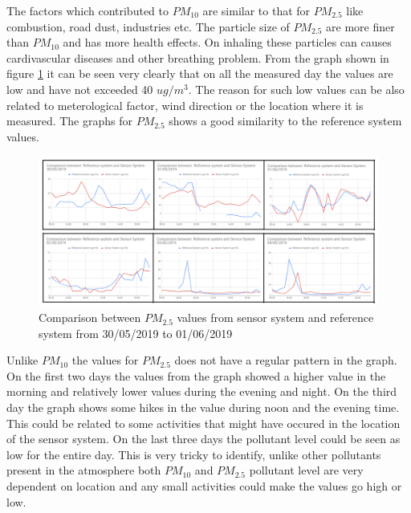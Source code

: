 The factors which contributed to $PM_{10}$ are similar to that for $PM_{2.5}$ like combustion, road dust, industries etc. The particle size of $PM_{2.5}$ are more finer than $PM_{10}$ and has more health effects. On inhaling these particles can causes cardivascular diseases and other breathing problem. From the graph shown in figure \ref{PM2.5} it can be seen very clearly that on all the measured day the values are low and have not exceeded 40 $ug/m^3$. The reason for such low values can be also related to meterological factor, wind direction or the location where it is measured. The graphs for $PM_{2.5}$ shows a good similarity to the reference system values.



\begin{figure}[h]
  \begin{center}
  \includegraphics[scale=0.70]{images/figure27.png}
  \end{center}
  \caption{Comparison between $PM_{2.5}$ values from sensor system and reference system from 30/05/2019 to 01/06/2019}
\label{PM2.5}
\end{figure}

Unlike $PM_{10}$  the values for $PM_{2.5}$ does not have a regular pattern in the graph. On the first two days the values from the graph showed a higher value in the morning and relatively lower values during the evening and night. On the third day the graph shows some hikes in the value during noon and the evening time. This could be related to some activities that might have occured in the location of the sensor system. On the last three days the pollutant level could be seen as low for the entire day. This is very tricky to identify, unlike other pollutants present in the atmosphere both $PM_{10}$  and $PM_{2.5}$ pollutant level are very dependent on location and any small activities could make the values go high or low.


